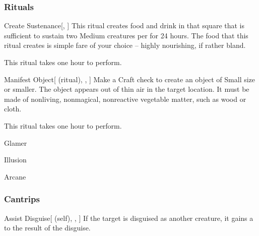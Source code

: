 \subsubsection{Rituals}


\lowercase{\hypertarget{spell:Create Sustenance}{}}\label{spell:Create Sustenance}
\begin{apability}[Rank 3]{\hypertarget{spell:Create Sustenance}{Create Sustenance}}[, ]
This ritual creates food and drink in that square that is sufficient to sustain two Medium creatures per  for 24 hours.
The food that this ritual creates is simple fare of your choice -- highly nourishing, if rather bland.

This ritual takes one hour to perform.
\end{apability}
\vspace{0.25em}



\lowercase{\hypertarget{spell:Manifest Object}{}}\label{spell:Manifest Object}
\begin{attuneability}[Rank 3]{\hypertarget{spell:Manifest Object}{Manifest Object}}[ (ritual), , ]
Make a Craft check to create an object of Small size or smaller.
The object appears out of thin air in the target location.
It must be made of nonliving, nonmagical, nonreactive vegetable matter, such as wood or cloth.

This ritual takes one hour to perform.
\end{attuneability}
\vspace{0.25em}


\newpage
\begin{spellsection}{Glamer}

\begin{spellheader}
\end{spellheader}


 Illusion

 Arcane

\subsubsection{Cantrips}


\begin{attuneability}{Assist Disguise}[ (self), , ]
If the target is disguised as another creature, it gains a   to the result of the disguise.
\end{attuneability}

\end{spellsection}


